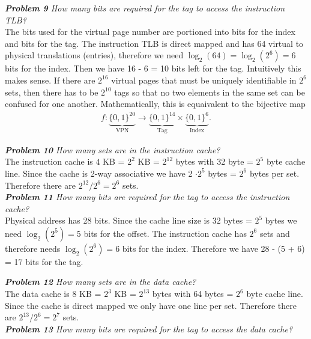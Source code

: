 \documentclass[12pt]{article}
\theoremstyle{remark}
\begin{document}
\textit{\textbf{Problem 9} How many bits are required for the tag to access the instruction TLB?} \\

The bits used for the virtual page number are portioned into bits for the index and bits for the tag. The instruction TLB is direct mapped and has 64 virtual to physical translations (entries), therefore we need $\log_2(64) = \log_2(2^6) = 6$ bits for the index. Then we have 16 - 6 = 10 bits left for the tag. Intuitively this makes sense. If there are $2^{16}$ virtual pages that must be uniquely identifiable in $2^6$ sets, then there has to be $2^{10}$ tags so that no two elements in the same set can be confused for one another. Mathematically, this is equaivalent to the bijective map
\begin{align*}
	f: \underbrace{\{0,1\}^{20}}_{\text{VPN}} \rightarrow \underbrace{\{0,1\}^{14}}_{\text{Tag}} \times \underbrace{\{0,1\}^{6}}_{\text{Index}}.
\end{align*}

\textit{\textbf{Problem 10} How many sets are in the instruction cache?} \\

The instruction cache is $4$ KB = $2^2$ KB = $2^{12}$ bytes with 32 byte = $2^5$ byte cache line. Since the cache is 2-way associative we have 2 $\cdot 2^5$ bytes = $2^6$ bytes per set. Therefore there are $2^{12}/2^6 = 2^6$ sets. \\

\textit{\textbf{Problem 11} How many bits are required for the tag to access the instruction cache?} \\

Physical address has 28 bits. Since the cache line size is $32$ bytes = $2^5$ bytes we need $\log_2(2^5) = 5$ bits for the offset. The instruction cache has $2^6$ sets and therefore needs $\log_2(2^6) = 6$ bits for the index. Therefore we have 28 - (5 + 6) = 17 bits for the tag. \\

\newpage

\textit{\textbf{Problem 12} How many sets are in the data cache?} \\

The data cache is 8 KB = $2^3$ KB = $2^13$ bytes with 64 bytes = $2^6$ byte cache line. Since the cache is direct mapped we only have one line per set. Therefore there are $2^13/2^6 = 2^7$ sets. \\

\textit{\textbf{Problem 13} How many bits are required for the tag to access the data cache?} \\
\end{document}
